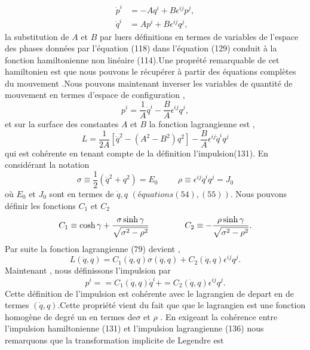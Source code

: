 \documentclass[12pt,a4paper, openany]{article}
\begin{document}
	\begin{equation}
		\left.\begin{aligned}
			\dot{p}^i&=-Aq^i+B\epsilon^{ij}p^j,\\
			\dot{q}^i&=Ap^i+B\epsilon^{ij}q^j,
		\end{aligned}\right.
		\end{equation}
		la substitution de $A$ et $B$ par luers définitions en termes de variables de l'espace des phases  données par l'équation (118) dans l'équation (129) conduit à la fonction hamiltonienne non linéaire (114).Une proprété remarquable de cet hamiltonien est que nous pouvons le récupérer à partir des équations complètes du mouvement .Nous pouvons maintenant inverser les variables de quantité de mouvement en termes d'espace de configuration ,
		\begin{equation}
			p^i=\frac{1}{A}\dot{q}^i-\frac{B}{A}\epsilon^{ij}q^j,
		\end{equation} 
		et sur la surface des constantes $A$ et $B$ la fonction lagrangienne est ,
		\begin{equation}
			L=\frac{1}{2A}\left[\dot{q}^{2}-\left(A^{2}-B^{2}\right)q^{2}\right]-\frac{B}{A}\epsilon^{ij}\dot{q}^iq^j
		\end{equation}
		qui est cohérente en tenant compte de la définition l'impulsion(131).
		En considérant la notation
		\begin{equation}
			\sigma\equiv\frac{1}{2}\left(\dot{q}^{2}+q^2\right)=E_0 \hspace{1cm}\rho\equiv\epsilon^{ij}\dot{q}^iq^j=J_0
		\end{equation}
		où $E_0$ et $J_0$ sont en termes de $\dot{q} , q $ $\left(équations (54) ,(55)\right)$. Nous pouvons définir les fonctions $C_1$ et $C_2$
		\begin{equation}
			C_1\equiv\cosh{\gamma}+\frac{\sigma\sinh{\gamma}}{\sqrt{\sigma^2-\rho^2}}\hspace{1.5cm}C_2\equiv-\frac{\rho\sinh{\gamma}}{\sqrt{\sigma^2-\rho^2}}.
		\end{equation}
		Par suite la fonction lagrangienne (79) devient ,
		\begin{equation}
			L(\dot{q} ,q )=C_1(\dot{q}, q )\sigma(\dot{q} ,q )+C_2(\dot{q}, q )\epsilon^{ij}q^j .
		\end{equation}
		Maintenant , nous définissons l'impulsion par 
		\begin{equation}
			p^i==C_1(\dot{q}, q )\dot{q}^i+=C_2(\dot{q}, q )\epsilon^{ij}q^j.
		\end{equation}
		Cette définition de l'impulsion est cohérente avec le lagrangien de depart en de termes $(\dot{q}, q )$.Cette propriété vient du fait que que le lagrangien est une fonction homogène de degré un en termes de$\sigma$ et $\rho$ . En exigeant la cohérence entre l'impulsion hamiltonienne (131) et l'impulsion lagrangienne (136) nous remarquons que la transformation implicite de Legendre est 
\end{document}
